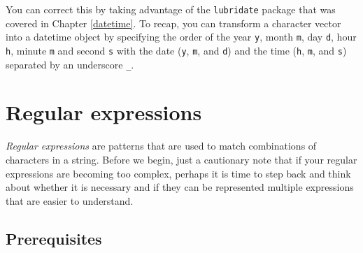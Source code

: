 \documentclass[
]{book}
\newenvironment{Shaded}{\begin{snugshade}}{\end{snugshade}}
\newcommand{\AttributeTok}[1]{\textcolor[rgb]{0.77,0.63,0.00}{#1}}
\newcommand{\CommentTok}[1]{\textcolor[rgb]{0.56,0.35,0.01}{\textit{#1}}}
\newcommand{\DecValTok}[1]{\textcolor[rgb]{0.00,0.00,0.81}{#1}}
\newcommand{\DocumentationTok}[1]{\textcolor[rgb]{0.56,0.35,0.01}{\textbf{\textit{#1}}}}
\newcommand{\FunctionTok}[1]{\textcolor[rgb]{0.00,0.00,0.00}{#1}}
\newcommand{\NormalTok}[1]{#1}
\newcommand{\OtherTok}[1]{\textcolor[rgb]{0.56,0.35,0.01}{#1}}
\newcommand{\SpecialCharTok}[1]{\textcolor[rgb]{0.00,0.00,0.00}{#1}}
\newcommand{\StringTok}[1]{\textcolor[rgb]{0.31,0.60,0.02}{#1}}
\begin{document}
You can correct this by taking advantage of the \texttt{lubridate} package that was covered in Chapter \ref{datetime}. To recap, you can transform a character vector into a datetime object by specifying the order of the year \texttt{y}, month \texttt{m}, day \texttt{d}, hour \texttt{h}, minute \texttt{m} and second \texttt{s} with the date (\texttt{y}, \texttt{m}, and \texttt{d}) and the time (\texttt{h}, \texttt{m}, and \texttt{s}) separated by an underscore \texttt{\_}.

\begin{Shaded}
\end{Shaded}

\hypertarget{regex}{%
\chapter{Regular expressions}\label{regex}}

\emph{Regular expressions} are patterns that are used to match combinations of characters in a string. Before we begin, just a cautionary note that if your regular expressions are becoming too complex, perhaps it is time to step back and think about whether it is necessary and if they can be represented multiple expressions that are easier to understand.

\hypertarget{prerequisites-4}{%
\section{Prerequisites}\label{prerequisites-4}}
\end{document}
